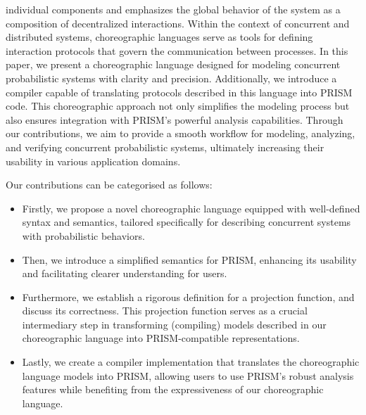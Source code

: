 individual components and emphasizes the global behavior of the system
as a composition of decentralized interactions. Within the context of
concurrent and distributed systems, choreographic languages serve as
tools for defining interaction protocols that govern the communication
between processes.
In this paper, we present a choreographic language designed for
modeling concurrent probabilistic systems with clarity and
precision. Additionally, we introduce a compiler capable of
translating protocols described in this language into PRISM code. This
choreographic approach not only simplifies the modeling process but
also ensures integration with PRISM's powerful analysis
capabilities. Through our contributions, we aim to provide a smooth
workflow for modeling, analyzing, and verifying concurrent
probabilistic systems, ultimately increasing their usability in
various application domains.


 Our contributions can be
categorised as follows:
\begin{itemize} 
\item Firstly, we propose a novel choreographic language equipped with
  well-defined syntax and semantics, tailored specifically for
  describing concurrent systems with probabilistic behaviors.
\item Then, we introduce a simplified semantics for PRISM, enhancing
  its usability and facilitating clearer understanding for users.
\item Furthermore, we establish a rigorous definition for a projection
  function, and discuss its correctness. This projection function
  serves as a crucial intermediary step in transforming (compiling)
  models described in our choreographic language into PRISM-compatible
  representations.
\item Lastly, we create a compiler implementation that translates the
  choreographic language models into PRISM, allowing users to use
  PRISM's robust analysis features while benefiting from the
  expressiveness of our choreographic language.
\end{itemize}



